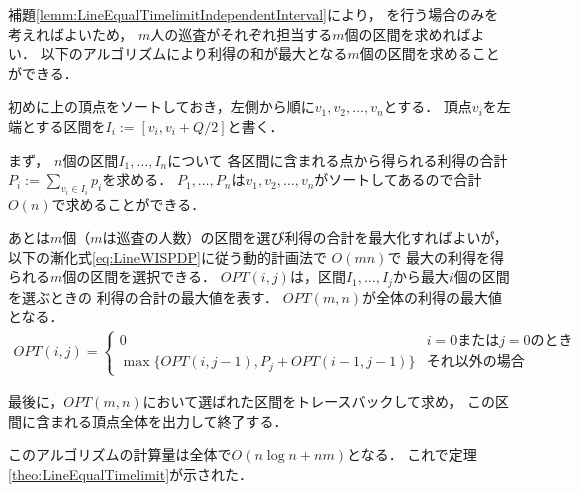 補題\ref{lemm:LineEqualTimelimitIndependentInterval}により，
{\indSectOperation}を行う場合のみを考えればよいため，
$m$人の巡査がそれぞれ担当する$m$個の区間を求めればよい．
以下のアルゴリズムにより利得の和が最大となる$m$個の区間を求めることができる．

初めに{\graphLine}上の頂点をソートしておき，左側から順に$v_1, v_2, \ldots, v_n$とする．
頂点$v_i$を左端とする区間を$I_i := [v_i, v_i + Q/2]$と書く．

まず，
$n$個の区間$I_1, \ldots, I_n$について
各区間に含まれる点から得られる利得の合計$P_i := \sum_{v_i \in I_i} p_i$を求める．
$P_1, \ldots, P_n$は$v_1, v_2, \ldots, v_n$がソートしてあるので合計$O(n)$で求めることができる．

あとは$m$個（$m$は巡査の人数）の区間を選び利得の合計を最大化すればよいが，
以下の漸化式\eqref{eq:LineWISPDP}に従う動的計画法で
$O(mn)$で
最大の利得を得られる$m$個の区間を選択できる．
$OPT(i,j)$は，区間$I_1, \ldots, I_j$から最大$i$個の区間を選ぶときの
利得の合計の最大値を表す．
$OPT(m,n)$が全体の利得の最大値となる．
\begin{align}
  \label{eq:LineWISPDP}
  OPT(i,j) = 
  \begin{cases}
    0 & \text{$i = 0$または$j = 0$のとき} \\
    \max \{
      OPT(i, j - 1), 
      P_j + OPT(i - 1, j - 1)
    \}
    & \text{それ以外の場合}
  \end{cases}
\end{align}

最後に，$OPT(m,n)$において選ばれた区間をトレースバックして求め，
この区間に含まれる頂点全体を出力して終了する．

このアルゴリズムの計算量は全体で$O(n \log n + nm)$となる．
これで定理\ref{theo:LineEqualTimelimit}が示された．


